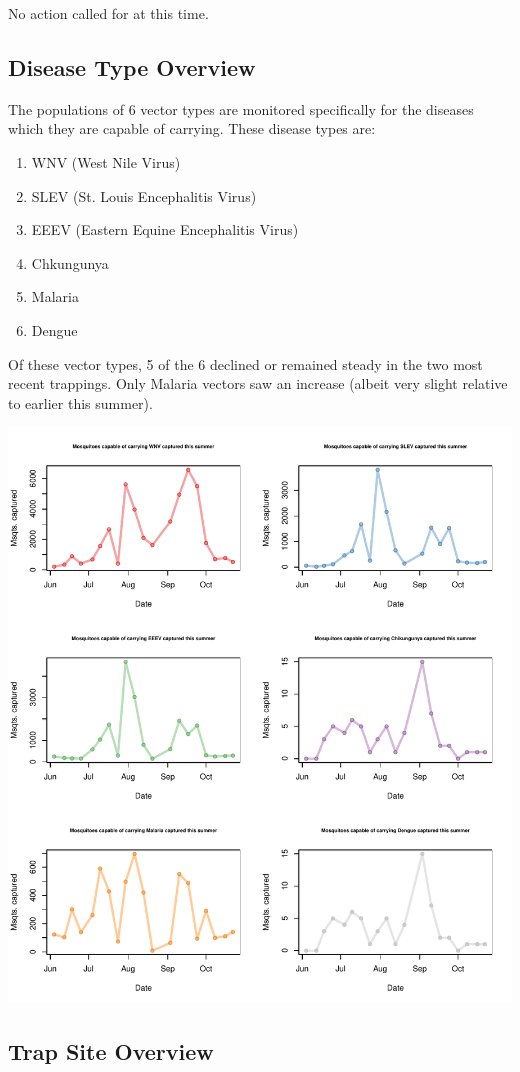 \documentclass{article}
\begin{document}
No action called for at this time.
\newpage
\begin{center}
\section*{Disease Type Overview}

\end{center}
The populations of 6 vector types are monitored specifically for the diseases which they are capable of carrying.  These disease types are:\\
\begin{enumerate}
  \item WNV (West Nile Virus)
  \item SLEV (St. Louis Encephalitis Virus)
  \item EEEV (Eastern Equine Encephalitis Virus)
  \item Chkungunya
  \item Malaria
  \item Dengue\\
\end{enumerate}
Of these vector types, 5 of the 6 declined or remained steady in the two most recent trappings.  Only Malaria vectors saw an increase (albeit very slight relative to earlier this summer).
\begin{center}
\includegraphics{mosq28oct13-005}
\end{center}
\newpage
\begin{center}
\section*{Trap Site Overview}

\end{center}
\end{document}

